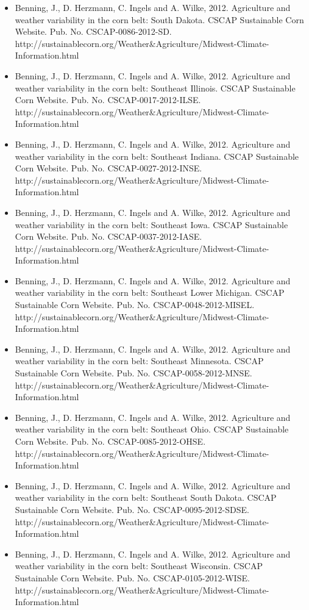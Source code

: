 \begin{itemize}
\item Benning, J., D. Herzmann, C. Ingels and A. Wilke, 2012. Agriculture and weather variability in the corn belt: South Dakota. CSCAP Sustainable Corn Website. Pub. No. CSCAP-0086-2012-SD. http://sustainablecorn.org/Weather\&Agriculture/Midwest-Climate-Information.html
\item Benning, J., D. Herzmann, C. Ingels and A. Wilke, 2012. Agriculture and weather variability in the corn belt: Southeast Illinois. CSCAP Sustainable Corn Website. Pub. No. CSCAP-0017-2012-ILSE. http://sustainablecorn.org/Weather\&Agriculture/Midwest-Climate-Information.html
\item Benning, J., D. Herzmann, C. Ingels and A. Wilke, 2012. Agriculture and weather variability in the corn belt: Southeast Indiana. CSCAP Sustainable Corn Website. Pub. No. CSCAP-0027-2012-INSE. http://sustainablecorn.org/Weather\&Agriculture/Midwest-Climate-Information.html
\item Benning, J., D. Herzmann, C. Ingels and A. Wilke, 2012. Agriculture and weather variability in the corn belt: Southeast Iowa. CSCAP Sustainable Corn Website. Pub. No. CSCAP-0037-2012-IASE. http://sustainablecorn.org/Weather\&Agriculture/Midwest-Climate-Information.html
\item Benning, J., D. Herzmann, C. Ingels and A. Wilke, 2012. Agriculture and weather variability in the corn belt: Southeast Lower Michigan. CSCAP Sustainable Corn Website. Pub. No. CSCAP-0048-2012-MISEL. http://sustainablecorn.org/Weather\&Agriculture/Midwest-Climate-Information.html
\item Benning, J., D. Herzmann, C. Ingels and A. Wilke, 2012. Agriculture and weather variability in the corn belt: Southeast Minnesota. CSCAP Sustainable Corn Website. Pub. No. CSCAP-0058-2012-MNSE. http://sustainablecorn.org/Weather\&Agriculture/Midwest-Climate-Information.html
\item Benning, J., D. Herzmann, C. Ingels and A. Wilke, 2012. Agriculture and weather variability in the corn belt: Southeast Ohio. CSCAP Sustainable Corn Website. Pub. No. CSCAP-0085-2012-OHSE. http://sustainablecorn.org/Weather\&Agriculture/Midwest-Climate-Information.html
\item Benning, J., D. Herzmann, C. Ingels and A. Wilke, 2012. Agriculture and weather variability in the corn belt: Southeast South Dakota. CSCAP Sustainable Corn Website. Pub. No. CSCAP-0095-2012-SDSE. http://sustainablecorn.org/Weather\&Agriculture/Midwest-Climate-Information.html
\item Benning, J., D. Herzmann, C. Ingels and A. Wilke, 2012. Agriculture and weather variability in the corn belt: Southeast Wisconsin. CSCAP Sustainable Corn Website. Pub. No. CSCAP-0105-2012-WISE. http://sustainablecorn.org/Weather\&Agriculture/Midwest-Climate-Information.html

\end{itemize}
